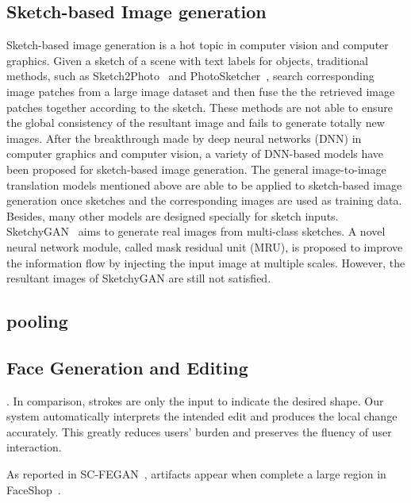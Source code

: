 \subsection{Sketch-based Image generation}
Sketch-based image generation is a hot topic in computer vision and computer graphics. Given a sketch of a scene with text labels for objects, traditional methods, such as Sketch2Photo~\cite{Sketch2Photo} and PhotoSketcher~\cite{PhotoSketcher}, search corresponding image patches from a large image dataset and then fuse the the retrieved image patches together according to the sketch. These methods are not able to ensure the global consistency of the resultant image and fails to generate totally new images.
%
After the breakthrough made by deep neural networks (DNN) in computer graphics and computer vision, a variety of DNN-based models have been proposed for sketch-based image generation. 
%
The general image-to-image translation models mentioned above are able to be applied to sketch-based image generation once sketches and the corresponding images are used as training data.
%
Besides, many other models are designed specially for sketch inputs. SketchyGAN~\cite{SketchyGAN} aims to generate real images from multi-class sketches. A novel neural network module, called mask residual unit (MRU), is proposed to improve the information flow by injecting the input image at multiple scales.  However, the resultant images of SketchyGAN are still not satisfied.
%

\subsection{pooling}

\subsection{Face Generation and Editing}

. In comparison, strokes are only the input to indicate the desired shape. Our system automatically interprets the intended edit and produces the local change accurately. This greatly reduces users' burden and preserves the fluency of user interaction. 

 As reported in SC-FEGAN~\cite{}, artifacts appear when complete a large region in FaceShop~\cite{}.
